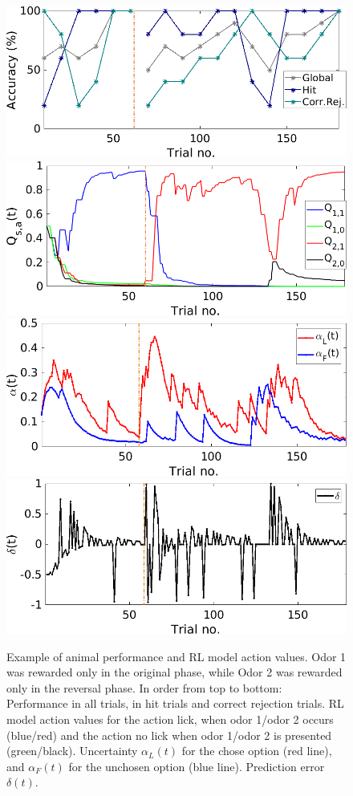 \begin{figure}
    \centering
    \includegraphics[scale=0.4]{figures/PerfEndrevAn1.png}
    \includegraphics[scale=0.4]{figures/QValuesEndrevAn1.png}
    \includegraphics[scale=0.4]{figures/AlphaEndrevAn1.png}
    \includegraphics[scale=0.4]{figures/DeltaEndrevAn1.png}
    \caption{Example of animal performance and RL model action
values. Odor 1 was rewarded only in the original phase, while Odor 2 was rewarded only in the reversal phase. In order from top to bottom: Performance in all trials, in hit trials and correct rejection trials. RL model action values for the action lick, when odor 1/odor 2 occurs (blue/red) and the action no lick when odor 1/odor 2 is presented (green/black). Uncertainty $\alpha_L(t)$ for the chose option (red line), and $\alpha_F(t)$ for the unchosen option (blue line). Prediction error $\delta(t)$.}
    \label{fig:L-Fmodel}
\end{figure}
